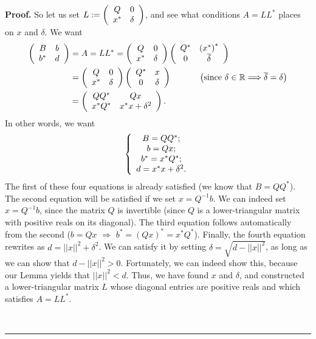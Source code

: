 \documentclass[numbers=enddot,12pt,final,onecolumn,notitlepage]{scrartcl}%
\numberwithin{exer}{subsection}
\theoremstyle{definition}
\newenvironment{proof}[1][Proof]{\noindent\textbf{#1.} }{\ \rule{0.5em}{0.5em}}
\begin{document}
\begin{proof}
So let us set $L:=\left(
\begin{array}
[c]{cc}%
Q & 0\\
x^{\ast} & \delta
\end{array}
\right)  $, and see what conditions $A=LL^{\ast}$ places on $x$ and $\delta$.
We want%
\begin{align*}
\left(
\begin{array}
[c]{cc}%
B & b\\
b^{\ast} & d
\end{array}
\right)   &  =A=LL^{\ast}=\left(
\begin{array}
[c]{cc}%
Q & 0\\
x^{\ast} & \delta
\end{array}
\right)  \left(
\begin{array}
[c]{cc}%
Q^{\ast} & \left(  x^{\ast}\right)  ^{\ast}\\
0 & \overline{\delta}%
\end{array}
\right) \\
&  =\left(
\begin{array}
[c]{cc}%
Q & 0\\
x^{\ast} & \delta
\end{array}
\right)  \left(
\begin{array}
[c]{cc}%
Q^{\ast} & x\\
0 & \delta
\end{array}
\right)  \ \ \ \ \ \ \ \ \ \ \left(  \text{since }\delta\in\mathbb{R}%
\Longrightarrow\overline{\delta}=\delta\right) \\
&  =\left(
\begin{array}
[c]{cc}%
QQ^{\ast} & Qx\\
x^{\ast}Q^{\ast} & x^{\ast}x+\delta^{2}%
\end{array}
\right)  .
\end{align*}
In other words, we want%
\[
\left\{
\begin{array}
[c]{c}%
B=QQ^{\ast};\\
b=Qx;\\
b^{\ast}=x^{\ast}Q^{\ast};\\
d=x^{\ast}x+\delta^{2}.
\end{array}
\right.
\]
The first of these four equations is already satisfied (we know that
$B=QQ^{\ast}$). The second equation will be satisfied if we set $x=Q^{-1}b$.
We can indeed set $x=Q^{-1}b$, since the matrix $Q$ is invertible (since $Q$
is a lower-triangular matrix with positive reals on its diagonal). The third
equation follows automatically from the second ($b=Qx$ $\Longrightarrow$
$b^{\ast}=\left(  Qx\right)  ^{\ast}=x^{\ast}Q^{\ast}$). Finally, the fourth
equation rewrites as $d=\left\vert \left\vert x\right\vert \right\vert
^{2}+\delta^{2}$. We can satisfy it by setting $\delta=\sqrt{d-\left\vert
\left\vert x\right\vert \right\vert ^{2}}$, as long as we can show that
$d-\left\vert \left\vert x\right\vert \right\vert ^{2}>0$. Fortunately, we can
indeed show this, because our Lemma yields that $\left\vert \left\vert
x\right\vert \right\vert ^{2}<d$. Thus, we have found $x$ and $\delta$, and
constructed a lower-triangular matrix $L$ whose diagonal entries are positive
reals and which satisfies $A=LL^{\ast}$.


\end{proof}
\end{document}
